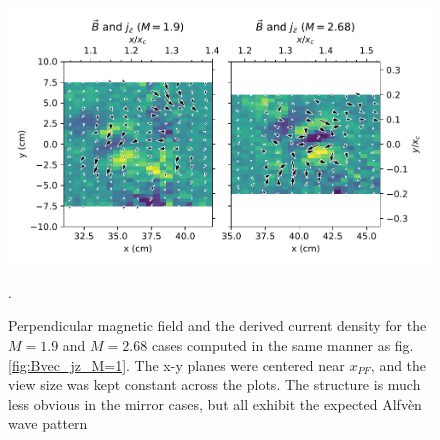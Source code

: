 \begin{figure}
    \centering
    \includegraphics[width=450pt]{figures/Bvec_Jz_M=1-9+2-68.pdf}
    \caption[Perpendicular magnetic field and the derived current density for the $M=1.9$ and $M=2.68$ cases]{Perpendicular magnetic field and the derived current density for the $M=1.9$ and $M=2.68$ cases computed in the same manner as fig. \ref{fig:Bvec_jz_M=1}. The x-y planes were centered near $x_{PF}$, and the view size was kept constant across the plots. The structure is much less obvious in the mirror cases, but all exhibit the expected Alfv\`en wave pattern}. 
    \label{fig:Bvec_jz_M=1-9+2-68}
\end{figure}

